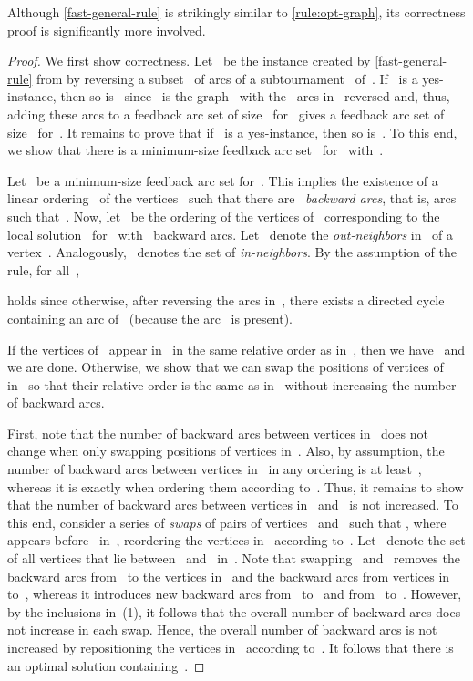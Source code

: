 \documentclass[envcountsame,numbook,smallextended]{svjour3}
\numberwithin{equation}{section}
\numberwithin{figure}{section}
\begin{document}
\noindent Although \cref{fast-general-rule} is strikingly similar to \cref{rule:opt-graph}, its correctness proof is significantly more involved.

\begin{proof}
  We first show correctness.
  Let~ be the instance
  created by \cref{fast-general-rule}
  from 
  by reversing a subset~ of arcs
  of a subtournament~ of~.
  If ~is a yes-instance,
  then so is~
  since ~is the graph~
  with the ~arcs in~ reversed
  and, thus,
  adding these arcs to a feedback arc set
  of size~ for~
  gives a feedback arc set of size~ for~.
  It remains to prove that
  if ~is a yes-instance,
  then so is~.
  To this end, we show that
  there is a minimum-size feedback arc set~
  for~ with~.
  
  Let~ be a minimum-size feedback arc set for~.
  This implies the existence
  of a linear ordering~
  of the vertices~
  such that there are~ \emph{backward arcs},
  that is,
  arcs~ such that~.
  Now, let~ be the ordering
  of the vertices of~
  corresponding to the local solution~ for~
  with ~backward arcs.
  Let~ denote the \emph{out-neighbors} in~ of a vertex~. Analogously,
  ~denotes 
  the set of \emph{in-neighbors}.
  By the assumption of the rule, for all~,
  
  holds since otherwise,
  after reversing the arcs in~,
  there exists a directed cycle containing an arc of~
  (because the arc~ is present).
  
  If the vertices of~ appear in~ in the same relative order as in~, then we have~ and we are done.
  Otherwise, we show that
  we can swap the positions of vertices of~ in~
  so that their relative order is the same as in~
  without increasing the number of backward arcs.


  First, note that the number of backward arcs
  between vertices in~
  does not change
  when only swapping positions of vertices in~.
  Also, by assumption,
  the number of backward arcs between vertices in~
  in any ordering is at least~,
  whereas it is exactly 
  when ordering them according to~.
  Thus,
  it remains to show that the number of backward arcs
  between vertices in~ and~
  is not increased.
  To this end,
  consider a series of \emph{swaps}
  of pairs of vertices~ and~ such that ,
  where  appears before~ in~,
  reordering the vertices in~ according to~.
  Let~ denote the set of all vertices that lie between~ and~ in~.
  Note that swapping~ and~ removes the backward arcs from~ to the vertices in~ and the backward arcs from vertices in~ to~, whereas it introduces new backward arcs from~ to~ and from~ to~.
  However, by the inclusions in~(1), it follows that the overall number of backward arcs does not increase in each swap.
  Hence, the overall number of backward arcs is not increased by repositioning the vertices in~
  according to~. It follows that there is an optimal solution containing~.
    

\end{proof}
\end{document}
